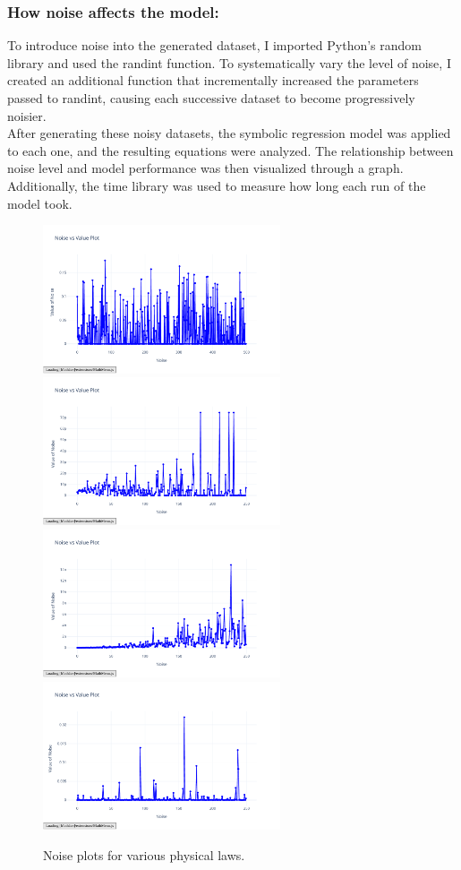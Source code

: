 \documentclass{article}
\begin{document}
\subsubsection{How noise affects the model: }

To introduce noise into the generated dataset, I imported Python’s random library and used the randint function. To systematically vary the level of noise, I created an additional function that incrementally increased the parameters passed to randint, causing each successive dataset to become progressively noisier.\\

After generating these noisy datasets, the symbolic regression model was applied to each one, and the resulting equations were analyzed. The relationship between noise level and model performance was then visualized through a graph. Additionally, the time library was used to measure how long each run of the model took.\\


\begin{figure}[H]
    \centering
    \includegraphics[width=7cm]{noise_conservation_random}
    \includegraphics[width=7cm]{noise_Newtons_First_Law_random}
    \includegraphics[width=7cm]{noise_Newtons_Third_Law_random}
    \includegraphics[width=7cm]{noise_Simple_Harmonic_Motion}
    \caption{Noise plots for various physical laws.}
    \label{fig:noise_plots}
\end{figure}
\end{document}
